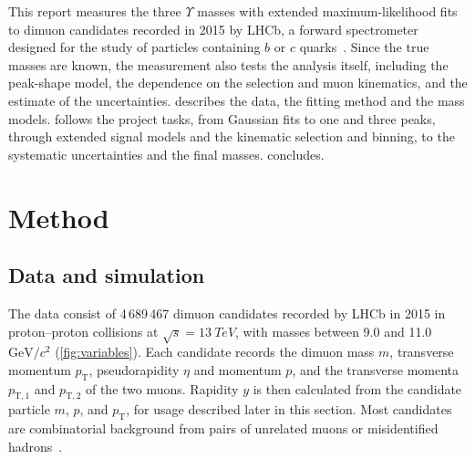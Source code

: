 \documentclass[a4paper,11pt]{article}
\newcommand{\GeVcc}{\ensuremath{\mathrm{GeV}/c^2}}
\newcommand{\pT}{\ensuremath{p_\mathrm{T}}}
\begin{document}
This report measures the three $\Upsilon$ masses with extended maximum-likelihood fits to dimuon candidates recorded in 2015 by LHCb, a forward spectrometer designed for the study of particles containing $b$ or $c$ quarks~\cite{LHCb:2013itw}.
Since the true masses are known, the measurement also tests the analysis itself, including the peak-shape model, the dependence on the selection and muon kinematics, and the estimate of the uncertainties.
 describes the data, the fitting method and the mass models.
 follows the project tasks, from Gaussian fits to one and three peaks, through extended signal models and the kinematic selection and binning, to the systematic uncertainties and the final masses.
 concludes.

\section{Method}
\label{sec:method}

\subsection{Data and simulation}
\label{sec:m-data}

The data consist of 4\,689\,467 dimuon candidates recorded by LHCb in 2015 in proton--proton collisions at $\sqrt{s} = \SI{13}{TeV}$, with masses between 9.0 and 11.0\,\GeVcc{} (\cref{fig:variables}).
Each candidate records the dimuon mass $m$, transverse momentum \pT{}, pseudorapidity $\eta$ and momentum $p$, and the transverse momenta $p_{\mathrm{T},1}$ and $p_{\mathrm{T},2}$ of the two muons.
Rapidity $y$ is then calculated from the candidate particle $m$, $p$, and \pT{}, for usage described later in this section.
Most candidates are combinatorial background from pairs of unrelated muons or misidentified hadrons~\cite{LHCb:2013itw}.
\end{document}

